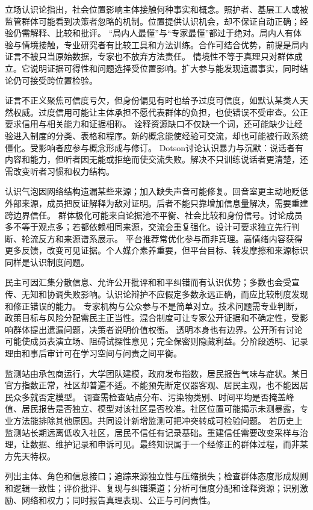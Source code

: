 立场认识论指出，社会位置影响主体接触何种事实和概念。照护者、基层工人或被监管群体可能看到决策者忽略的机制。位置提供认识机会，却不保证自动正确；经验仍需解释、比较和批评。 “局内人最懂”与“专家最懂”都过于绝对。局内人有体验与情境接触，专业研究者有比较工具和方法训练。合作可结合优势，前提是局内证言不被只当原始数据，专家也不放弃方法责任。 情境性不等于真理只对群体成立。它说明证据可得性和问题选择受位置影响。扩大参与能发现遗漏事实，同时结论仍可接受跨位置检验。

证言不正义聚焦可信度亏欠，但身份偏见有时也给予过度可信度，如默认某类人天然权威。过度信用可能让主体承担不愿代表群体的负担，也使错误不受审查。公正要求信用与相关能力和证据相称。 诠释资源缺口不仅缺一个词，还可能缺少让经验进入制度的分类、表格和程序。新的概念能使经验可交流，却也可能被行政系统僵化。受影响者应参与概念形成与修订。 Dotson讨论认识暴力与沉默：说话者有内容和能力，但听者因无能或拒绝而使交流失败\parencite{dotson2011}。解决不只训练说话者更清楚，还需改变听者习惯和权力结构。

认识气泡因网络结构遗漏某些来源；加入缺失声音可能修复。回音室更主动地贬低外部来源，成员把反证解释为敌对证明。后者不能只靠增加信息量解决，需要重建跨边界信任。 群体极化可能来自论据池不平衡、社会比较和身份信号。讨论成员多不等于观点多；若都依赖相同来源，交流会重复强化。设计可要求独立先行判断、轮流反方和来源谱系展示。 平台推荐常优化参与而非真理。高情绪内容获得更多反馈，改变可见证据。个人媒介素养重要，但平台目标、转发摩擦和来源标识同样是认识制度问题。

民主可因汇集分散信息、允许公开批评和和平纠错而有认识优势；多数也会受宣传、无知和协调失败影响。认识论辩护不应假定多数永远正确，而应比较制度发现和修正错误的能力。 专家机构与公众参与不是简单对立。技术问题需专业判断，政策目标与风险分配需民主正当性。混合制度可让专家公开证据和不确定性，受影响群体提出遗漏问题，决策者说明价值权衡。 透明本身也有边界。公开所有讨论可能使成员表演立场、阻碍试探性意见；完全保密则隐藏利益。分阶段透明、记录理由和事后审计可在学习空间与问责之间平衡。

监测站由承包商运行，大学团队建模，政府发布指数，居民报告气味与症状。某日官方指数正常，社区却普遍不适。不能预先断定仪器客观、居民主观，也不能因居民众多就否定模型。 调查需检查站点分布、污染物类别、时间平均是否掩盖峰值、居民报告是否独立、模型对该社区是否校准。社区位置可能揭示未测暴露，专业方法能排除其他原因。共同设计新增监测可把冲突转成可检验问题。 若历史上监测站长期远离低收入社区，居民不信任有记录基础。重建信任需要改变采样与治理，让数据、维护记录和申诉可见。最终知识属于一个经修正的群体过程，而非某方先天特权。

\begin{tcolorbox}[breakable,colback=white,colframe=blue!30!black,title={社会认识系统审计表},fonttitle=\bfseries]
列出主体、角色和信息接口；追踪来源独立性与压缩损失；检查群体态度形成规则和逻辑一致性；评价批评、复现与纠错渠道；分析可信度分配和诠释资源；识别激励、网络和权力；同时报告真理表现、公正与可问责性。
\end{tcolorbox}
